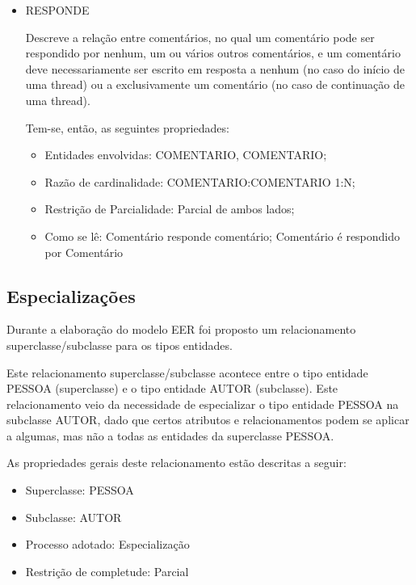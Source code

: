 \begin{itemize}
				\item RESPONDE

Descreve a relação entre comentários, no qual um comentário pode ser respondido por nenhum, um ou vários outros comentários, e um comentário deve necessariamente ser escrito em resposta a nenhum (no caso do início de uma thread) ou a exclusivamente um comentário (no caso de continuação de uma thread).

Tem-se, então, as seguintes propriedades:
\begin{itemize}

\item Entidades envolvidas: COMENTARIO, COMENTARIO;
\item Razão de cardinalidade: COMENTARIO:COMENTARIO 1:N;
\item Restrição de Parcialidade: Parcial de ambos lados;
\item Como se lê: Comentário responde comentário; Comentário é respondido por Comentário
\end{itemize}
\end{itemize}

\subsection{Especializações}

Durante a elaboração do modelo EER foi proposto um relacionamento superclasse/subclasse para os tipos entidades.

Este relacionamento superclasse/subclasse acontece entre o tipo entidade PESSOA (superclasse) e o tipo entidade AUTOR (subclasse). Este relacionamento veio da necessidade de especializar o tipo entidade PESSOA na subclasse AUTOR, dado que certos atributos e relacionamentos podem se aplicar a algumas, mas não a todas as entidades da superclasse PESSOA.

 As propriedades gerais deste relacionamento estão descritas a seguir:
 \begin{itemize}
				 \item Superclasse: PESSOA
				 \item Subclasse: AUTOR
				 \item Processo adotado: Especialização
				 \item Restrição de completude: Parcial
 \end{itemize}
